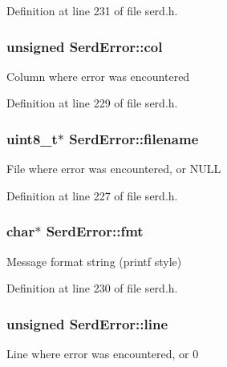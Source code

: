 Definition at line 231 of file serd.\+h.

\subsubsection[{\texorpdfstring{col}{col}}]{\setlength{\rightskip}{0pt plus 5cm}unsigned Serd\+Error\+::col}\hypertarget{struct_serd_error_aa44d03c985deafe03b6c6e9b2241aebe}{}\label{struct_serd_error_aa44d03c985deafe03b6c6e9b2241aebe}
Column where error was encountered 

Definition at line 229 of file serd.\+h.

\subsubsection[{\texorpdfstring{filename}{filename}}]{ {\bf uint8\+\_\+t}$\ast$ Serd\+Error\+::filename}\hypertarget{struct_serd_error_a7ce492ac3be5bf5dae7394edd260bc79}{}\label{struct_serd_error_a7ce492ac3be5bf5dae7394edd260bc79}
File where error was encountered, or N\+U\+LL 

Definition at line 227 of file serd.\+h.

\subsubsection[{\texorpdfstring{fmt}{fmt}}]{ char$\ast$ Serd\+Error\+::fmt}\hypertarget{struct_serd_error_a79ca1a8093c602b5c8a2aa21aa711e0a}{}\label{struct_serd_error_a79ca1a8093c602b5c8a2aa21aa711e0a}
Message format string (printf style) 

Definition at line 230 of file serd.\+h.

\subsubsection[{\texorpdfstring{line}{line}}]{\setlength{\rightskip}{0pt plus 5cm}unsigned Serd\+Error\+::line}\hypertarget{struct_serd_error_af168bcd27bcecea6a3560195cebca4d8}{}\label{struct_serd_error_af168bcd27bcecea6a3560195cebca4d8}
Line where error was encountered, or 0 

